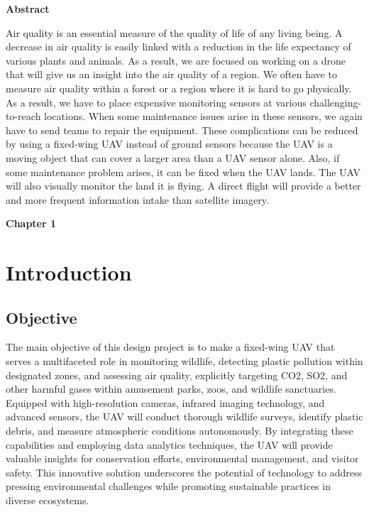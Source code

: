 \documentclass[12 pt]{article}
\begin{document}
\newpage
\vspace*{\fill}

\begin{center}
    \textbf{Abstract} \\ \vspace{0.5 cm}
\end{center}
Air quality is an essential measure of the quality of life of any living being. A decrease in air quality is easily linked with a reduction in the life expectancy of various plants and animals.
As a result, we are focused on working on a drone that will give us an insight into the air quality of a region. 
We often have to measure air quality within a forest or a region where it is hard to go physically. As a result, we have to place expensive monitoring sensors at various challenging-to-reach locations. 
When some maintenance issues arise in these sensors, we again have to send teams to repair the equipment.
These complications can be reduced by using a fixed-wing UAV instead of ground sensors because the UAV is a moving object that can cover a larger area than a UAV sensor alone. Also, if some maintenance problem arises, it can be fixed when the UAV lands.
The UAV will also visually monitor the land it is flying. A direct flight will provide a better and more frequent information intake than satellite imagery.

\vspace*{\fill}


\newpage

\tableofcontents

\newpage

\thispagestyle{empty}
\listoffigures
\listoftables
\newpage

\textbf{\Huge{Chapter 1}}
\section{Introduction}

\subsection{Objective}
The main objective of this design project is to make a fixed-wing UAV that serves a multifaceted role in monitoring wildlife, detecting plastic pollution within designated zones, and assessing air quality, explicitly targeting CO2, SO2, and other harmful gases within amusement parks, zoos, and wildlife sanctuaries. Equipped with high-resolution cameras, infrared imaging technology, and advanced sensors, the UAV will conduct thorough wildlife surveys, identify plastic debris, and measure atmospheric conditions autonomously. By integrating these capabilities and employing data analytics techniques, the UAV will provide valuable insights for conservation efforts, environmental management, and visitor safety. This innovative solution underscores the potential of technology to address pressing environmental challenges while promoting sustainable practices in diverse ecosystems.
\end{document}
